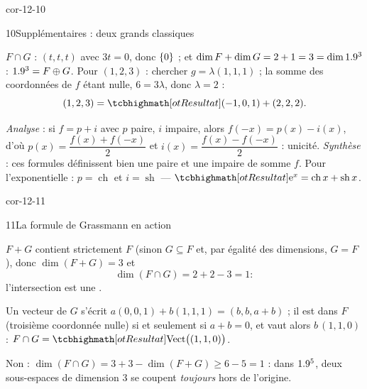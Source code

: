 \begin{blocLivre}{cor-12-10}
\begin{corrige}{10}{Supplémentaires : deux grands classiques}
\begin{questions}
  \item $F\cap G$ : $(t,t,t)$ avec $3t=0$, donc $\left\{0\right\}$ ; et
    $\dim F+\dim G=2+1=3=\dim1.9^{3}$ : $1.9^{3}=F\oplus G$. Pour $(1,2,3)$ :
    chercher $g=\lambda(1,1,1)$ ; la somme des coordonnées de $f$ étant
    nulle, $6=3\lambda$, donc $\lambda=2$ :
    \[
    (1,2,3)=\res{(-1,0,1)+(2,2,2)}.
    \]
  \item \emph{Analyse} : si $f=p+i$ avec $p$ paire, $i$ impaire, alors
    $f(-x)=p(x)-i(x)$, d'où $p(x)=\dfrac{f(x)+f(-x)}{2}$ et
    $i(x)=\dfrac{f(x)-f(-x)}{2}$ : unicité. \emph{Synthèse} : ces formules
    définissent bien une paire et une impaire de somme $f$. Pour
    l'exponentielle : $p=\operatorname{ch}$ et $i=\operatorname{sh}$ —
    $\res{\mathrm{e}^{x}=\operatorname{ch}x+\operatorname{sh}x}$.
\end{questions}
\end{corrige}
\end{blocLivre}

\begin{blocLivre}{cor-12-11}
\begin{corrige}{11}{La formule de Grassmann en action}
\begin{questions}
  \item $F+G$ contient strictement $F$ (sinon $G\subseteq F$ et, par
    égalité des dimensions, $G=F$), donc $\dim(F+G)=3$ et
    \[
    \dim(F\cap G)=2+2-3=1 :
    \]
    l'intersection est une .
  \item Un vecteur de $G$ s'écrit $a(0,0,1)+b(1,1,1)=(b,b,a+b)$ ; il est
    dans $F$ (troisième coordonnée nulle) si et seulement si $a+b=0$, et
    vaut alors $b\,(1,1,0)$ :
    $F\cap G=\res{\operatorname{Vect}\bigl((1,1,0)\bigr)}$.
  \item Non : $\dim(F\cap G)=3+3-\dim(F+G)\geqslant6-5=1$ : dans $1.9^{5}$,
    deux sous-espaces de dimension $3$ se coupent \emph{toujours} hors de
    l'origine.
\end{questions}
\end{corrige}
\end{blocLivre}

